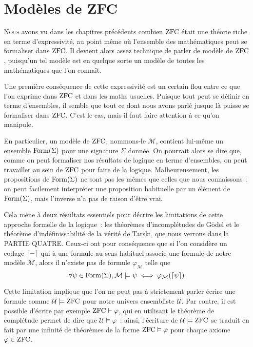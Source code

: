 \chapter{Modèles de ZFC}
\label{chp.modZFC}

\minitoc

\lettrine{N}{ous} avons vu dans les chapitres précédents combien $\operatorname{ZFC}$ était
une théorie riche en terme d'expressivité, au point même où l'ensemble des
mathématiques peut se formaliser dans $\operatorname{ZFC}$. Il devient alors assez technique
de parler de modèle de $\operatorname{ZFC}$, puisqu'un tel modèle est en quelque sorte un
modèle de toutes les mathématiques que l'on connaît.

Une première conséquence de cette expressivité est un certain flou entre ce que
l'on exprime dans $\operatorname{ZFC}$ et dans les maths usuelles. Puisque tout peut se
définir en terme d'ensembles, il semble que tout ce dont nous avons parlé jusque
là puisse se formaliser dans $\operatorname{ZFC}$. C'est le cas, mais il faut faire attention
à ce qu'on manipule.

En particulier, un modèle de $\operatorname{ZFC}$, nommons-le $\mathcal M$, contient lui-même
un ensemble $\operatorname{Form}(\Sigma)$ pour une signature $\Sigma$ donnée. On pourrait
alors se dire que, comme on peut formaliser nos résultats de logique en terme
d'ensembles, on peut travailler au sein de $\operatorname{ZFC}$ pour faire de la logique.
Malheureusement, les propositions de $\operatorname{Form}(\Sigma)$ ne sont pas les mêmes
que celles que nous connaissons~: on peut facilement interpréter une proposition
habituelle par un élément de $\operatorname{Form}(\Sigma)$, mais l'inverse n'a pas de
raison d'être vrai.

Cela mène à deux résultats essentiels pour décrire les limitations de cette
approche formelle de la logique~: les théorèmes d'incomplétudes de Gödel et le
théorème d'indéfinissabilité de la vérité de Tarski, que nous verrons dans la
PARTIE QUATRE. Ceux-ci ont pour conséquence que si l'on considère un codage
$\lceil-\rceil$ qui à une formule au sens habituel associe une formule de notre
modèle $\mathcal M$, alors il n'existe pas de formule $\varphi_{\mathcal M}$
telle que
\[\forall \psi \in \operatorname{Form}(\Sigma), \mathcal M \models \psi
\iff \mathcal \varphi_{\mathcal M}(\lceil\psi\rceil)\]

Cette limitation implique que l'on ne peut pas à strictement
parler écrire une formule comme $\mathcal U\models \operatorname{ZFC}$ pour notre univers
ensembliste $\mathcal U$. Par contre, il est possible d'écrire par exemple
$\operatorname{ZFC}\vdash \varphi$, qui en utilisant le théorème de complétude permet de dire
que $\mathcal U \models \varphi$~: ainsi, l'écriture de $\mathcal U\models\operatorname{ZFC}$
se traduit en fait par une infinité de théorèmes de la forme
$\operatorname{ZFC}\vDash \varphi$ pour chaque axiome $\varphi \in \operatorname{ZFC}$.

